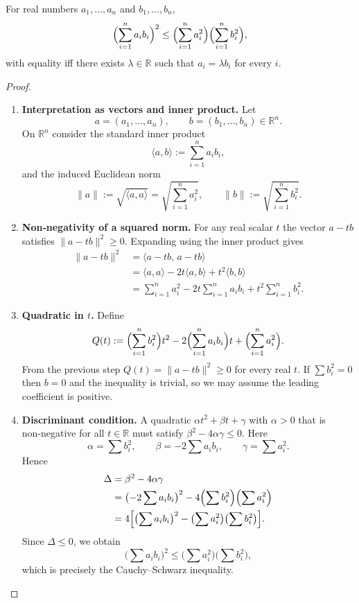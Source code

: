 \begin{theorem}
For real numbers $a_{1},\dots ,a_{n}$ and $b_{1},\dots ,b_{n}$,
\[
\Bigl(\sum_{i=1}^{n} a_{i}b_{i}\Bigr)^{2}
\le
\Bigl(\sum_{i=1}^{n} a_{i}^{2}\Bigr)\Bigl(\sum_{i=1}^{n} b_{i}^{2}\Bigr),
\]
with equality iff there exists $\lambda\in\mathbb{R}$ such that $a_{i}=\lambda b_{i}$ for every $i$.
\end{theorem}
\begin{proof}
\begin{enumerate}
\item \textbf{Interpretation as vectors and inner product.}
Let
\[
a=(a_{1},\dots ,a_{n}),\qquad b=(b_{1},\dots ,b_{n})\in\mathbb{R}^{n}.
\]
On $\mathbb{R}^{n}$ consider the standard inner product
\[
\langle a,b\rangle:=\sum_{i=1}^{n} a_{i}b_{i},
\]
and the induced Euclidean norm
\[
\|a\|:=\sqrt{\langle a,a\rangle}= \sqrt{\sum_{i=1}^{n} a_{i}^{2}},\qquad
\|b\|:=\sqrt{\sum_{i=1}^{n} b_{i}^{2}}.
\]

\item \textbf{Non‑negativity of a squared norm.}
For any real scalar $t$ the vector $a-tb$ satisfies $\|a-tb\|^{2}\ge0$.
Expanding using the inner product gives
\begin{align*}
\|a-tb\|^{2}
&=\langle a-tb,\,a-tb\rangle \\
&=\langle a,a\rangle-2t\langle a,b\rangle+t^{2}\langle b,b\rangle \\
&=\sum_{i=1}^{n} a_{i}^{2}-2t\sum_{i=1}^{n} a_{i}b_{i}
   +t^{2}\sum_{i=1}^{n} b_{i}^{2}.
\end{align*}

\item \textbf{Quadratic in $t$.}
Define
\[
Q(t):=\Bigl(\sum_{i=1}^{n} b_{i}^{2}\Bigr)t^{2}
       -2\Bigl(\sum_{i=1}^{n} a_{i}b_{i}\Bigr)t
       +\Bigl(\sum_{i=1}^{n} a_{i}^{2}\Bigr).
\]
From the previous step $Q(t)=\|a-tb\|^{2}\ge0$ for every real $t$.
If $\sum b_{i}^{2}=0$ then $b=0$ and the inequality is trivial, so we may assume the leading coefficient is positive.

\item \textbf{Discriminant condition.}
A quadratic $\alpha t^{2}+\beta t+\gamma$ with $\alpha>0$ that is non‑negative for all $t\in\mathbb{R}$ must satisfy $\beta^{2}-4\alpha\gamma\le0$.
Here
\[
\alpha=\sum b_{i}^{2},\qquad
\beta=-2\sum a_{i}b_{i},\qquad
\gamma=\sum a_{i}^{2}.
\]
Hence
\begin{align*}
\Delta
&=\beta^{2}-4\alpha\gamma \\
&=\bigl(-2\sum a_{i}b_{i}\bigr)^{2}
   -4\Bigl(\sum b_{i}^{2}\Bigr)\Bigl(\sum a_{i}^{2}\Bigr) \\
&=4\Bigl[\bigl(\sum a_{i}b_{i}\bigr)^{2}
        -\bigl(\sum a_{i}^{2}\bigr)\bigl(\sum b_{i}^{2}\bigr)\Bigr].
\end{align*}
Since $\Delta\le0$, we obtain
\[
\bigl(\sum a_{i}b_{i}\bigr)^{2}
\le
\bigl(\sum a_{i}^{2}\bigr)\bigl(\sum b_{i}^{2}\bigr),
\]
which is precisely the Cauchy–Schwarz inequality.


\end{enumerate}
\end{proof}
